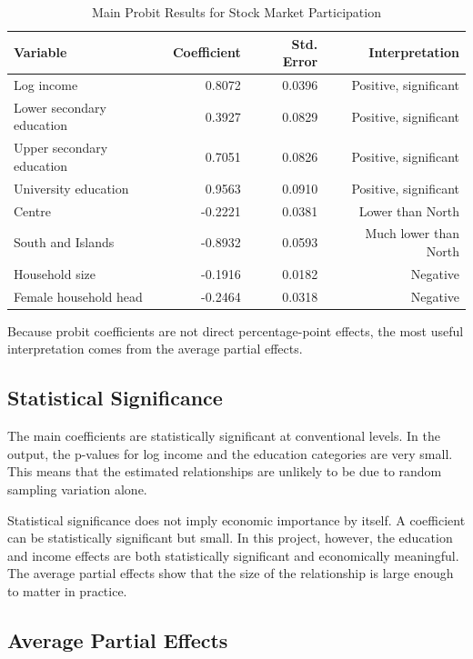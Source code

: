 \documentclass[12pt]{article}
\begin{document}
\begin{table}[H]
\centering
\caption{Main Probit Results for Stock Market Participation}
\begin{tabular}{lrrr}
\toprule
\textbf{Variable} & \textbf{Coefficient} & \textbf{Std. Error} & \textbf{Interpretation} \\
\midrule
Log income & 0.8072 & 0.0396 & Positive, significant \\
Lower secondary education & 0.3927 & 0.0829 & Positive, significant \\
Upper secondary education & 0.7051 & 0.0826 & Positive, significant \\
University education & 0.9563 & 0.0910 & Positive, significant \\
Centre & -0.2221 & 0.0381 & Lower than North \\
South and Islands & -0.8932 & 0.0593 & Much lower than North \\
Household size & -0.1916 & 0.0182 & Negative \\
Female household head & -0.2464 & 0.0318 & Negative \\
\bottomrule
\end{tabular}
\end{table}

Because probit coefficients are not direct percentage-point effects, the most useful interpretation comes from the average partial effects.

\subsection{Statistical Significance}

The main coefficients are statistically significant at conventional levels. In the output, the p-values for log income and the education categories are very small. This means that the estimated relationships are unlikely to be due to random sampling variation alone.

Statistical significance does not imply economic importance by itself. A coefficient can be statistically significant but small. In this project, however, the education and income effects are both statistically significant and economically meaningful. The average partial effects show that the size of the relationship is large enough to matter in practice.

\subsection{Average Partial Effects}
\end{document}

